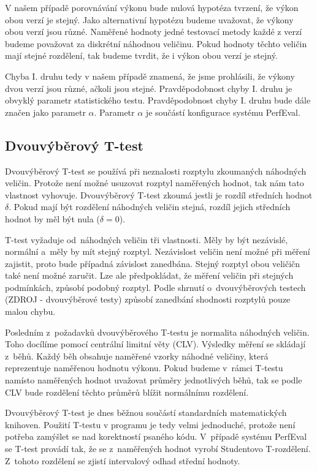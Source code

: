 V našem případě porovnávání výkonu bude nulová hypotéza tvrzení, že výkon obou verzí je stejný.
Jako alternativní hypotézu budeme uvažovat, že výkony obou verzí jsou různé.
Naměřené hodnoty jedné testovací metody každé z verzí budeme považovat za diskrétní náhodnou veličinu.
Pokud hodnoty těchto veličin mají stejné rozdělení, tak budeme tvrdit, že i výkon obou verzí je stejný.

Chyba I. druhu tedy v našem případě znamená, že jsme prohlásili, že výkony dvou verzí jsou různé,
ačkoli jsou stejné. Pravděpodobnost chyby I. druhu je obvyklý parametr statistického testu.
Pravděpodobnost chyby I. druhu bude dále značen jako parametr $\alpha$. Parametr $\alpha$
je součástí konfigurace systému PerfEval.

\subsection{Dvouvýběrový T-test}

Dvouvýběrový T-test se používá při neznalosti rozptylu zkoumaných náhodných veličin.
Protože není možné usuzovat rozptyl naměřených hodnot, tak nám tato vlastnost vyhovuje.
Dvouvýběrový T-test zkoumá jestli je rozdíl středních hodnot $\delta$.
Pokud mají být rozdělení náhodných veličin stejná, rozdíl jejich středních hodnot by měl být nula ($\delta = 0$).

T-test vyžaduje od~náhodných veličin tři vlastnosti. Měly by být nezávislé, normální
a~měly by mít stejný rozptyl. Nezávislost veličin není možné při měření zajistit,
proto bude případná závislost zanedbána. Stejný rozptyl obou veličičn také není možné zaručit.
Lze ale předpokládat, že měření veličin při stejných podmínkách, způsobí podobný rozptyl.
Podle shrnutí o~dvouvýběrových testech (ZDROJ - dvouvýběrové testy) %
způsobí zanedbání shodnosti rozptylů pouze malou chybu.

Posledním z~požadavků dvouvýběrového T-testu je normalita náhodných veličin. Toho docílíme pomocí centrální limitní věty (CLV).
Výsledky měření se skládají z~běhů. Každý běh obsahuje naměřené vzorky náhodné veličiny, která reprezentuje naměřenou hodnotu výkonu.
Pokud budeme v~rámci T-testu namísto naměřených hodnot uvažovat průměry jednotlivých běhů, tak se podle CLV
bude rozdělení těchto průměrů blížit normálnímu rozdělení.

Dvouvýběrový T-test je dnes běžnou součástí standardních matematických knihoven.
Použití T-testu v programu je tedy velmi jednoduché, protože není potřeba zamýšlet se
nad korektností psaného kódu. V~případě systému PerfEval se T-test provádí tak, že
se z~naměřených hodnot vyrobí Studentovo T-rozdělení. Z~tohoto rozdělení se zjistí
intervalový odhad střední hodnoty.

